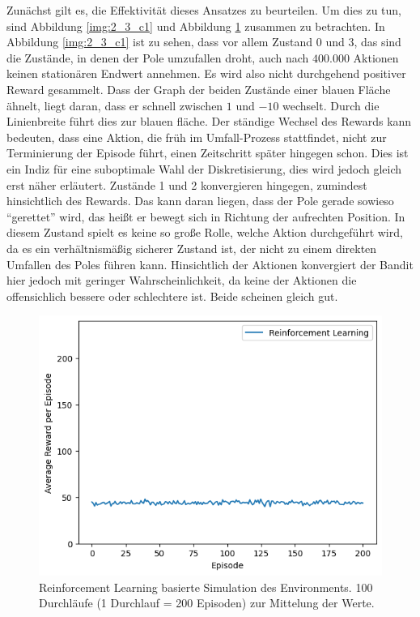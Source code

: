 \documentclass[11pt]{article}
\begin{document}
Zunächst gilt es, die Effektivität dieses Ansatzes zu beurteilen. Um dies zu tun, sind Abbildung \ref{img:2_3_c1} und Abbildung \ref{img:2_3_c2} zusammen zu betrachten. In Abbildung \ref{img:2_3_c1} ist zu sehen, dass vor allem Zustand 0 und 3, das sind die Zustände, in denen der Pole umzufallen droht, auch nach $400.000$ Aktionen keinen stationären Endwert annehmen. Es wird also nicht durchgehend positiver Reward gesammelt. Dass der Graph der beiden Zustände einer blauen Fläche ähnelt, liegt daran, dass er schnell zwischen $1$ und $-10$ wechselt. Durch die Linienbreite führt dies zur blauen fläche. Der ständige Wechsel des Rewards kann bedeuten, dass eine Aktion, die früh im Umfall-Prozess stattfindet, nicht zur Terminierung der Episode führt, einen Zeitschritt später hingegen schon. Dies ist ein Indiz für eine suboptimale Wahl der Diskretisierung, dies wird jedoch gleich erst näher erläutert. Zustände 1 und 2 konvergieren hingegen, zumindest hinsichtlich des Rewards. Das kann daran liegen, dass der Pole gerade sowieso ``gerettet'' wird, das heißt er bewegt sich in Richtung der aufrechten Position. In diesem Zustand spielt es keine so große Rolle, welche Aktion durchgeführt wird, da es ein verhältnismäßig sicherer Zustand ist, der nicht zu einem direkten Umfallen des Poles führen kann. Hinsichtlich der Aktionen konvergiert der Bandit hier jedoch mit geringer Wahrscheinlichkeit, da keine der Aktionen die offensichlich bessere oder schlechtere ist. Beide scheinen gleich gut.\\
\begin{figure}
    \centering
    \includegraphics[width=\textwidth]{img/img_2_3_c2.png}
    \caption{Reinforcement Learning basierte Simulation des Environments. 100 Durchläufe (1 Durchlauf = 200 Episoden) zur Mittelung der Werte.}
    \label{img:2_3_c2}
\end{figure}
\end{document}
